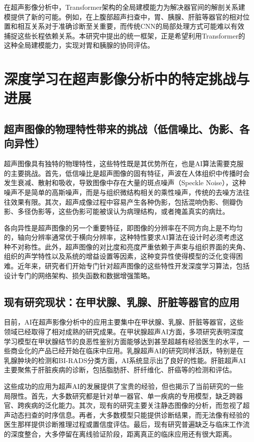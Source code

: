 在超声影像分析中，Transformer架构的全局建模能力为解决器官间的解剖关系建模提供了新的可能。例如，在上腹部超声扫查中，胃、胰腺、肝脏等器官的相对位置和相互关系对于准确诊断至关重要，而传统CNN的局部处理方式可能难以有效捕捉这些长程依赖关系。本研究中提出的统一框架，正是希望利用Transformer的这种全局建模能力，实现对胃和胰腺的协同评估。

\section{深度学习在超声影像分析中的特定挑战与进展}

\subsection{超声图像的物理特性带来的挑战（低信噪比、伪影、各向异性）}

超声图像具有独特的物理特性，这些特性既是其优势所在，也是AI算法需要克服的主要挑战。首先，低信噪比是超声图像的固有特征，声波在人体组织中传播时会发生衰减、散射和吸收，导致图像中存在大量的斑点噪声（Speckle Noise），这种噪声不是简单的高斯噪声，而是与组织微结构相关的乘性噪声，传统的去噪方法往往效果有限。其次，超声成像过程中容易产生各种伪影，包括混响伪影、侧瓣伪影、多径伪影等，这些伪影可能被误认为病理结构，或者掩盖真实的病灶。

各向异性是超声图像的另一个重要特征，即图像的分辨率在不同方向上是不均匀的，轴向分辨率通常优于横向分辨率，这种特性要求AI算法在设计时必须考虑这种不对称性。此外，超声图像的对比度和亮度严重依赖于声束与组织界面的夹角、组织的声学特性以及系统的增益设置等因素，这种变异性使得模型的泛化变得困难。近年来，研究者们开始专门针对超声图像的这些特性开发深度学习算法，包括设计专门的网络架构、损失函数和数据增强策略。

\subsection{现有研究现状：在甲状腺、乳腺、肝脏等器官的应用}

目前，AI在超声影像分析中的应用主要集中在甲状腺、乳腺、肝脏等器官，这些领域已经取得了相对成熟的研究成果。在甲状腺超声AI方面，多项研究表明深度学习模型在甲状腺结节的良恶性鉴别方面能够达到甚至超越有经验医生的水平，一些商业化的产品已经开始在临床中应用。乳腺超声AI的研究同样活跃，特别是在乳腺肿块的检测和BI-RADS分类方面，AI系统显示出了良好的性能。肝脏超声AI主要聚焦于肝脏疾病的诊断，包括脂肪肝、肝纤维化、肝癌等的检测和评估。

这些成功的应用为超声AI的发展提供了宝贵的经验，但也揭示了当前研究的一些局限性。首先，大多数研究都是针对单一器官、单一疾病的专用模型，缺乏跨器官、跨疾病的泛化能力。其次，现有的研究主要关注静态图像的分析，而忽视了超声动态扫查的时序信息。再者，大多数模型只能提供诊断结果，而无法像有经验的医生那样提供诊断推理过程或置信度评估。最后，现有研究普遍缺乏与临床工作流的深度整合，大多停留在离线验证阶段，距离真正的临床应用还有很大距离。

